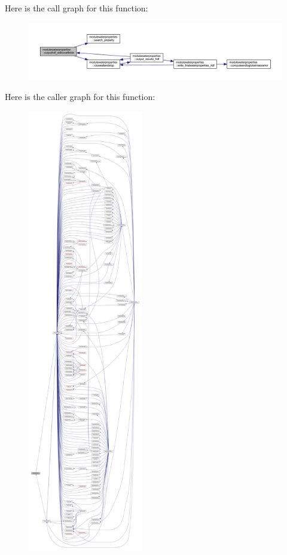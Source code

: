 Here is the call graph for this function\+:\nopagebreak
\begin{figure}[H]
\begin{center}
\leavevmode
\includegraphics[width=350pt]{namespacemodulewaterproperties_a0e590dc368b505cd9ea918d724d3eee3_cgraph}
\end{center}
\end{figure}
Here is the caller graph for this function\+:\nopagebreak
\begin{figure}[H]
\begin{center}
\leavevmode
\includegraphics[height=550pt]{namespacemodulewaterproperties_a0e590dc368b505cd9ea918d724d3eee3_icgraph}
\end{center}
\end{figure}
\mbox{\label{namespacemodulewaterproperties_a24b8d7aa76331b7a72150e027594beba}} 
